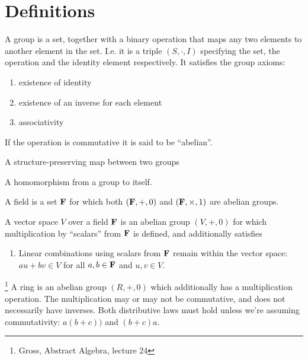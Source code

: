 \newcommand{\alphainv}{\alpha^{-1}}

\section{Definitions}

\begin{definition*}[Group]
  A group is a set, together with a binary operation that maps any two elements
  to another element in the set. I.e. it is a triple $(S, \cdot, I)$ specifying
  the set, the operation and the identity element respectively. It satisfies the
  group axioms:
  \begin{enumerate}
  \item existence of identity
  \item existence of an inverse for each element
  \item associativity
  \end{enumerate}
  If the operation is commutative it is said to be ``abelian''.
\end{definition*}

\begin{definition*}[Homomorphism]
  A structure-preserving map between two groups
\end{definition*}

\begin{definition*}[Endomorphism]
  A homomorphism from a group to itself.
\end{definition*}

\begin{definition*}[Field]
  A field is a set $\mathbf{F}$ for which both $(\mathbf{F}, +, 0)$ and $(\mathbf{F}, \times, 1)$ are abelian groups.
\end{definition*}

\begin{definition*}
  A vector space $V$ over a field $\mathbf{F}$ is an abelian group $(V, +, 0)$ for which
  multiplication by ``scalars'' from $\mathbf{F}$ is defined, and additionally satisfies
  \begin{enumerate}
  \item Linear combinations using scalars from $\mathbf{F}$ remain within the vector
    space:\\
    $au + bv \in V$ for all $a, b \in \mathbf{F}$ and $u, v \in V$.
  \end{enumerate}
\end{definition*}

\begin{definition*}[Ring]\footnote{Gross, Abstract Algebra, lecture 24}
A ring is an abelian group $(R, +, 0)$ which additionally has a multiplication
operation. The multiplication may or may not be commutative, and does not
necessarily have inverses. Both distributive laws must hold unless we're
assuming commutativity: $a(b + c))$ and $(b + c)a$.
\end{definition*}

